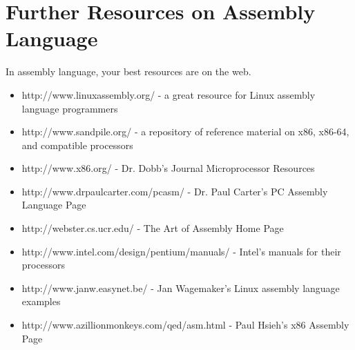 \section{Further Resources on Assembly Language}

In assembly language, your best resources are on the web.

\begin{itemize}\item http://www.linuxassembly.org/ - a great resource for Linux assembly language programmers 
\item http://www.sandpile.org/ - a repository of reference material on x86, x86-64, and compatible processors 
\item http://www.x86.org/ - Dr. Dobb's Journal Microprocessor Resources 
\item http://www.drpaulcarter.com/pcasm/ - Dr. Paul Carter's PC Assembly Language Page 
\item http://webster.cs.ucr.edu/ - The Art of Assembly Home Page 
\item http://www.intel.com/design/pentium/manuals/ - Intel's manuals for their processors 
\item http://www.janw.easynet.be/ - Jan Wagemaker's Linux assembly language examples 
\item http://www.azillionmonkeys.com/qed/asm.html - Paul Hsieh's x86 Assembly Page 
\end{itemize}

% 
% 

% 

% 
% 

% 
% 

